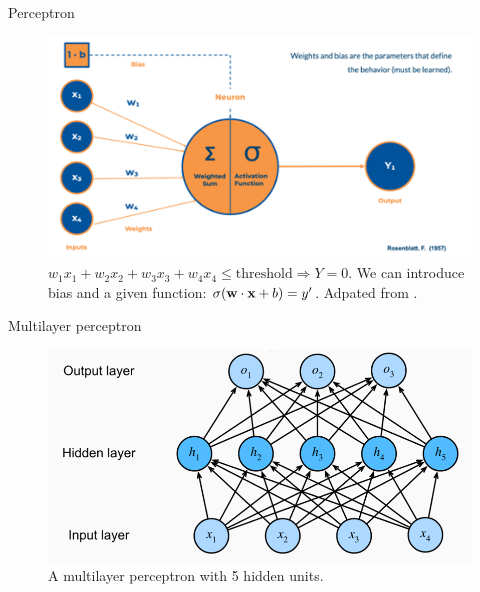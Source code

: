 \documentclass{beamer}
\begin{document}
\begin{frame}{Perceptron}
    \begin{figure}
        \includegraphics[width=0.9\linewidth]{perceptron}
        \caption{$w_1 x_1 + w_2 x_2 +w_3x_3+w_4x_4 \leq \mathrm{threshold} \Rightarrow Y=0$. We can introduce bias and a given function: $\sigma(\textbf{w}\cdot \textbf{x}+b)=y'$. Adpated from \cite{rosenblatt_perceptron_1958}.}
        \label{Fig:perceptron}
    \end{figure}
\end{frame}

\begin{frame}{Multilayer perceptron}
    \begin{figure}
        \includegraphics[width=0.9\linewidth]{MLP}
        \caption{A multilayer perceptron with 5 hidden units.}
        \label{Fig:perceptron}
    \end{figure}
\end{frame}
\end{document}
